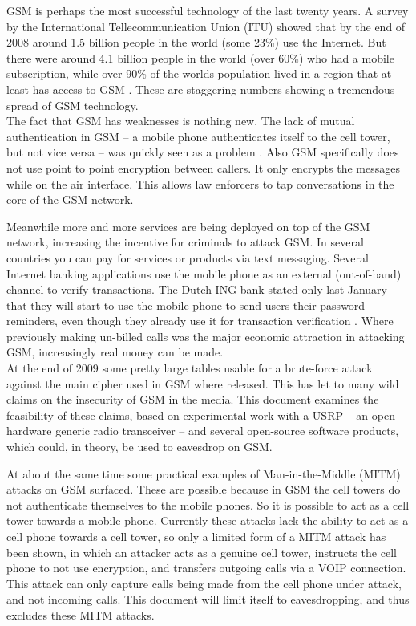 \documentclass[a4paper,11pt]{llncs}
\begin{document}
GSM is perhaps the most successful technology of the last twenty years. A survey by the International Tellecommunication Union (ITU) showed that by the end of 2008 around 1.5 billion people in the world (some 23\%) use the Internet. But there were around 4.1 billion people in the world (over 60\%) who had a mobile subscription, while over 90\% of the worlds population lived in a region that at least has access to GSM \cite{guardian}.
These are staggering numbers showing a tremendous spread of GSM technology.\\

The fact that GSM has weaknesses is nothing new. The lack of mutual authentication in GSM -- a mobile phone authenticates itself to the cell tower, but not vice versa -- was quickly seen as a problem \cite{anderson:secEng}. Also GSM specifically does not use point to point encryption between callers. It only encrypts the messages while on the air interface. This allows law enforcers to tap conversations in the core of the GSM network.

Meanwhile more and more services are being deployed on top of the GSM network, increasing the incentive for criminals to attack GSM. In several countries you can pay for services or products via text messaging. Several Internet banking applications use the mobile phone as an external (out-of-band) channel to verify transactions. The Dutch ING bank stated only last January that they will start to use the mobile phone to send users their password reminders, even though they already use it for transaction verification \cite{url:ING}.
Where previously making un-billed calls was the major economic attraction in attacking GSM, increasingly real money can be made.\\

At the end of 2009 some pretty large tables usable for a brute-force attack against the main cipher used in GSM where released. This has let to many wild claims on the insecurity of GSM in the media.
This document examines the feasibility of these claims, based on experimental work with a USRP -- an open-hardware generic radio transceiver -- and several open-source software products, which could, in theory, be used to eavesdrop on GSM.

At about the same time some practical examples of Man-in-the-Middle (MITM) attacks on GSM surfaced. These are possible because in GSM the cell towers do not authenticate themselves to the mobile phones. So it is possible to act as a cell tower towards a mobile phone. Currently these attacks lack the ability to act as a cell phone towards a cell tower, so only a limited form of a MITM attack has been shown, in which an attacker acts as a genuine cell tower, instructs the cell phone to not use encryption, and transfers outgoing calls via a VOIP connection. This attack can only capture calls being made from the cell phone under attack, and not incoming calls. This document will limit itself to eavesdropping, and thus excludes these MITM attacks. 
\end{document}
